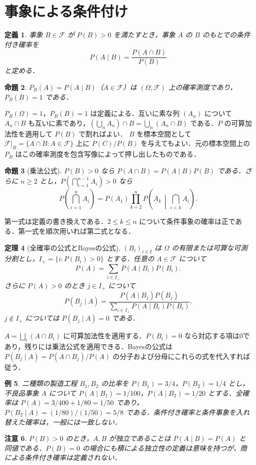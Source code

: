 \documentclass[a5paper,10pt,onecolumn]{jsarticle}
\makeatletter
\theoremstyle{mathnotetheorem}
\newtheorem{theorem}{定理}[section]
\newtheorem{definition}[theorem]{定義}
\newtheorem{proposition}[theorem]{命題}
\newtheorem{example}[theorem]{例}
\newtheorem{remark}[theorem]{注意}
\renewcommand{\proofname}{証明}
\renewenvironment{proof}[1][\proofname]{%
  \par\pushQED{\qed}\normalfont\topsep4\p@\@plus2\p@\relax
  \trivlist\item[\hskip\labelsep\bfseries #1]\ignorespaces
}{\popQED\endtrivlist\@endpefalse}
\newcommand{\F}{\mathcal F}
\newcommand{\1}{\mathbf{1}}
\makeatother
\begin{document}
\section{事象による条件付け}
\begin{definition}
事象 $B\in\F$ が $P(B)>0$ を満たすとき，事象 $A$ の $B$ のもとでの条件付き確率を
\[
 P(A\mid B)=\frac{P(A\cap B)}{P(B)}
\]
と定める．
\end{definition}
\begin{proposition}
$P_B(A)=P(A\mid B)$（$A\in\F$）は $(\Omega,\F)$ 上の確率測度であり，$P_B(B)=1$ である．
\end{proposition}
\begin{proof}
$P_B(\Omega)=1$，$P_B(B)=1$ は定義による．互いに素な列 $(A_n)$ について $A_n\cap B$ も互いに素であり，$(\bigcup_nA_n)\cap B=\bigcup_n(A_n\cap B)$ である．$P$ の可算加法性を適用して $P(B)$ で割ればよい．
\end{proof}
$B$ を標本空間として $\F|_B=\{A\cap B:A\in\F\}$ 上に $P(C)/P(B)$ を与えてもよい．元の標本空間上の $P_B$ はこの確率測度を包含写像によって押し出したものである．
\begin{proposition}[乗法公式]
$P(B)>0$ なら $P(A\cap B)=P(A\mid B)P(B)$ である．さらに $n\ge2$ とし，$P(\bigcap_{i=1}^{n-1}A_i)>0$ なら
\[
 P\left(\bigcap_{i=1}^n A_i\right)
 =P(A_1)\prod_{k=2}^n P\left(A_k\,\middle|\,\bigcap_{i<k}A_i\right).
\]
\end{proposition}
\begin{proof}
第一式は定義の書き換えである．$2\le k\le n$ について条件事象の確率は正である．第一式を順次用いれば第二式となる．
\end{proof}
\begin{theorem}[全確率の公式とBayesの公式]\label{bayes}
$(B_i)_{i\in I}$ は $\Omega$ の有限または可算な可測分割とし，$I_+=\{i:P(B_i)>0\}$ とする．任意の $A\in\F$ について
\[
 P(A)=\sum_{i\in I_+}P(A\mid B_i)P(B_i).
\]
さらに $P(A)>0$ のとき $j\in I_+$ について
\[
 P(B_j\mid A)=
 \frac{P(A\mid B_j)P(B_j)}{\sum_{i\in I_+}P(A\mid B_i)P(B_i)}.
\]
$j\notin I_+$ については $P(B_j\mid A)=0$ である．
\end{theorem}
\begin{proof}
$A=\bigsqcup_i(A\cap B_i)$ に可算加法性を適用する．$P(B_i)=0$ なら対応する項は0であり，残りには乗法公式を適用できる．Bayesの公式は $P(B_j\mid A)=P(A\cap B_j)/P(A)$ の分子および分母にこれらの式を代入すれば従う．
\end{proof}
\begin{example}
二種類の製造工程 $B_1,B_2$ の比率を $P(B_1)=3/4$，$P(B_2)=1/4$ とし，不良品事象 $A$ について $P(A\mid B_1)=1/100$，$P(A\mid B_2)=1/20$ とする．全確率は $P(A)=3/400+1/80=1/50$ であり，$P(B_2\mid A)=(1/80)/(1/50)=5/8$ である．条件付き確率と条件事象を入れ替えた確率は，一般には一致しない．
\end{example}
\begin{remark}
$P(B)>0$ のとき，$A,B$ が独立であることは $P(A\mid B)=P(A)$ と同値である．$P(B)=0$ の場合にも積による独立性の定義は意味を持つが，商による条件付き確率は定義されない．
\end{remark}
\end{document}

